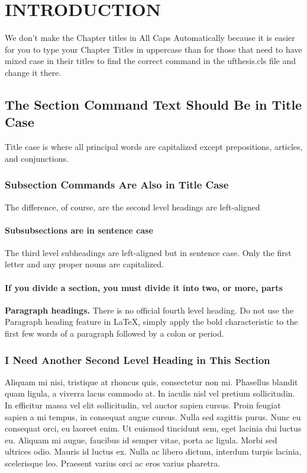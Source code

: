\chapter{INTRODUCTION} \label{intro}

We don't make the Chapter titles in All Caps Automatically because it is easier for you to type your Chapter Titles in uppercase than for those that need to have mixed case in their titles to find the correct command in the ufthesis.cls file and change it there. \cite{strickler1998contamination}

\section{The Section Command Text Should Be in Title Case}

 Title case is where all principal words are capitalized except prepositions, articles, and conjunctions.  \cite{green2008wrinkle}

\subsection{Subsection Commands Are Also in Title Case}
The difference, of course, are the second level headings are left-aligned

\subsubsection{Subsubsections are in sentence case}
The third level subheadings are left-aligned but in sentence case. Only the first letter and any proper nouns are capitalized.

\subsubsection{If you divide a section, you must divide it into two, or more, parts}

{\bf Paragraph headings.} There is no official fourth level heading. Do not use the Paragraph heading feature in LaTeX, simply apply the bold characteristic to the first few words of a paragraph followed by a colon or period.

\subsection{I Need Another Second Level Heading in This Section}

Aliquam mi nisi, tristique at rhoncus quis, consectetur non mi. Phasellus blandit quam ligula, a viverra lacus commodo at. In iaculis nisl vel pretium sollicitudin. In efficitur massa vel elit sollicitudin, vel auctor sapien cursus. Proin feugiat sapien a mi tempus, in consequat augue cursus. Nulla sed sagittis purus. Nunc eu consequat orci, eu laoreet enim. Ut euismod tincidunt sem, eget lacinia dui luctus eu. Aliquam mi augue, faucibus id semper vitae, porta ac ligula. Morbi sed ultrices odio. Mauris id luctus ex. Nulla ac libero dictum, interdum turpis lacinia, scelerisque leo. Praesent varius orci ac eros varius pharetra.


